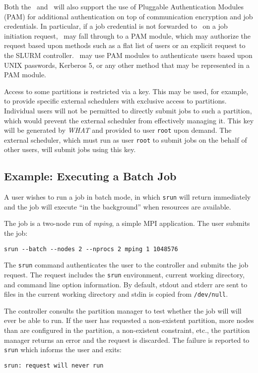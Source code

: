 Both the \slurmd\ and \slurmctld\ will also support the use
of Pluggable Authentication Modules (PAM) for additional authentication on
top of communication encryption and job credentials. In particular, if a
job credential is not forwarded to \slurmd\ on a job initiation request,
\slurmd\ may fall through to a PAM module, which may authorize the request
based upon methods such as a flat list of users or an explicit request
to the SLURM controller. \slurmctld\ may use PAM modules to authenticate
users based upon UNIX passwords, Kerberos 5, or any other method that
may be represented in a PAM module.

Access to some partitions is restricted via a key.  This may be used,
for example, to provide specific external schedulers with exclusive access
to partitions.  Individual users will not be permitted to directly submit
jobs to such a partition, which would prevent the external scheduler
from effectively managing it.  This key will be generated by {\em WHAT}
and provided to user {\tt root} upon demand.  The external scheduler,
which must run as user {\tt root} to submit jobs on the behalf of other
users, will submit jobs using this key.

\subsection{Example:  Executing a Batch Job}

A user wishes to run a job in batch mode, in which {\tt srun} will return 
immediately and the job will execute ``in the background'' when resources
are available.

The job is a two-node run of {\em mping}, a simple MPI application.
The user submits the job:
\begin{verbatim}
srun --batch --nodes 2 --nprocs 2 mping 1 1048576
\end{verbatim}

The {\tt srun} command authenticates the user to the controller and submits
the job request. 
The request includes the {\tt srun} environment, current working directory, 
and command line option information. By default, stdout and stderr are
sent to files in the current working directory and stdin is copied from
{\tt /dev/null}.

The controller consults the partition manager to test whether the job will
will ever be able to run.  If the user has requested a non-existent partition,
more nodes than are configured in the partition, a non-existent constraint, 
etc., the partition manager returns an error and the request is discarded.
The failure is reported to {\tt srun} which informs the user and exits:
\begin{verbatim}
srun: request will never run
\end{verbatim}

